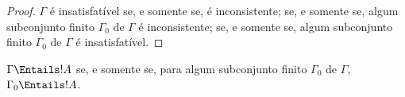 \documentclass[../../../include/open-logic-section]{subfiles}
\begin{document}
\begin{proof}
$\Gamma$ é insatisfatível se, e somente se, é inconsistente; se, e
  somente se, algum subconjunto finito $\Gamma_0$ de $\Gamma$ é
  inconsistente; se, e somente se, algum subconjunto finito $\Gamma_0$
  de $\Gamma$ é insatisfatível.
\end{proof}

\begin{cor}
$\Gamma \Entails !A$ se, e somente se, para algum subconjunto finito
$\Gamma_0$ de $\Gamma$, $\Gamma_0 \Entails !A$.
\end{cor}
\end{document}
